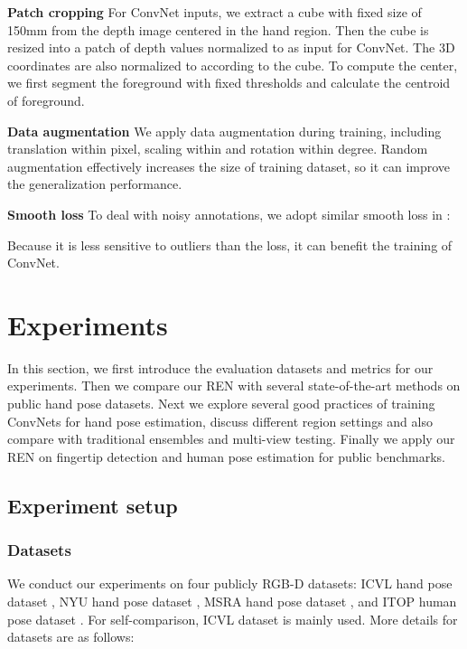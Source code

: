\documentclass[10pt,twocolumn,letterpaper]{article}
\begin{document}
\noindent\textbf{Patch cropping}\hspace{2mm} For ConvNet inputs, we extract a cube with fixed size of 150mm from the depth image centered in the hand region. Then the cube is resized into a  patch of depth values normalized to  as input for ConvNet. The 3D coordinates are also normalized to  according to the cube. To compute the center, we first segment the foreground with fixed thresholds and calculate the centroid of foreground.

\noindent\textbf{Data augmentation}\hspace{2mm} We apply data augmentation during training, including translation within  pixel, scaling within  and rotation within  degree. Random augmentation effectively increases the size of training dataset, so it can improve the generalization performance.

\noindent\textbf{Smooth  loss}\hspace{2mm} To deal with noisy annotations, we adopt similar smooth  loss in \cite{girshick2015fast}:

Because it is less sensitive to outliers than the  loss, it can benefit the training of ConvNet.

\section{Experiments}
In this section, we first introduce the evaluation datasets and metrics for our experiments. Then we compare our REN with several state-of-the-art methods on public hand pose datasets. Next we explore several good practices of training ConvNets for hand pose estimation, discuss different region settings and also compare with traditional ensembles and multi-view testing. Finally we apply our REN on fingertip detection and human pose estimation for public benchmarks. 

\subsection{Experiment setup}
\subsubsection{Datasets}
We conduct our experiments on four publicly RGB-D datasets: ICVL hand pose dataset \cite{tang2014latent}, NYU hand pose dataset \cite{tompson2014real}, MSRA hand pose dataset \cite{sun2015cascaded}, and ITOP human pose dataset \cite{haque2016towards}. For self-comparison, ICVL dataset is mainly used. More details for datasets are as follows:
\end{document}
